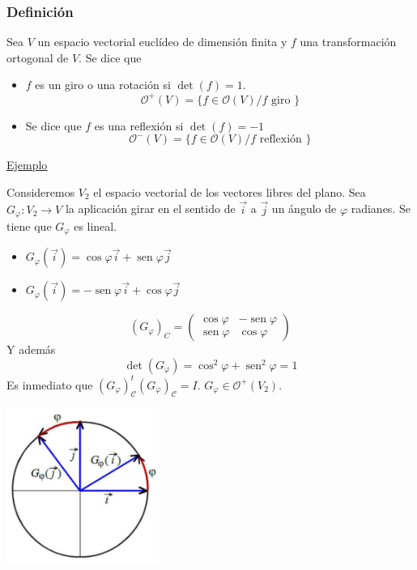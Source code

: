 \documentclass[12pt, a4paper, ones, notitlepage, openany,titlepage]{article}
\begin{document}
\subsubsection{Definición}
Sea $V$ un espacio vectorial euclídeo de dimensión finita y $f$ una transformación ortogonal de $V$. Se dice que
\begin{itemize}
	\item $f$ es un giro o una rotación si $\operatorname{det}(f)=1$.
	$$
	\mathcal{O}^+(V) = \{f \in \mathcal{O}(V) / f \text{ giro }\}
	$$
	\item Se dice que $f$ es una reflexión si $\operatorname{det}(f)=-1$
	$$
	\mathcal{O}^-(V) = \{f \in \mathcal{O}(V) / f \text{ reflexión }\}
	$$
\end{itemize}

\noindent\underline{Ejemplo}

Consideremos $V_2$ el espacio vectorial de los vectores libres del plano. Sea $G_\varphi : V_2 \to V$ la aplicación girar en el sentido de $\overrightarrow{i}$ a $\overrightarrow{j}$ un ángulo de $\varphi$ radianes. Se tiene que $G_\varphi$ es lineal.
\begin{itemize}
	\item $G_\varphi (\overrightarrow{i}) = \operatorname{cos} \varphi \overrightarrow{i} + \operatorname{sen} \varphi \overrightarrow{j}$
	\item $G_\varphi (\overrightarrow{i}) = -\operatorname{sen} \varphi \overrightarrow{i} + \operatorname{cos} \varphi \overrightarrow{j}$
\end{itemize}

$$
\left(G_{\varphi}\right)_{C}=\left(\begin{array}{rr}
	\cos \varphi & -\operatorname{sen} \varphi \\
	\operatorname{sen} \varphi & \cos \varphi
\end{array}\right)
$$
Y además
$$
\operatorname{det}(G_\varphi) = \operatorname{cos}^2 \varphi + \operatorname{sen}^2 \varphi = 1
$$
Es inmediato que $(G_\varphi)^t_\mathcal{C} (G_\varphi)_\mathcal{C} = I$. $G_\varphi \in \mathcal{O}^+(V_2)$.

\begin{center}
	\includegraphics[max width=5cm]{2023_03_20_c2fe6c117849a1a0e8afg-052}
\end{center}
\end{document}
